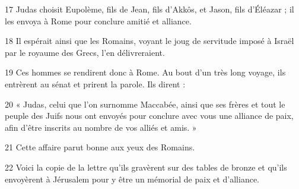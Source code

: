 17 Judas choisit Eupolème, fils de Jean, fils d’Akkôs, et Jason, fils d’Éléazar ; il les envoya à Rome pour conclure amitié et alliance.

18 Il espérait ainsi que les Romains, voyant le joug de servitude imposé à Israël par le royaume des Grecs, l’en délivreraient.

19 Ces hommes se rendirent donc à Rome. Au bout d’un très long voyage, ils entrèrent au sénat et prirent la parole. Ils dirent :

20 « Judas, celui que l’on surnomme Maccabée, ainsi que ses frères et tout le peuple des Juifs nous ont envoyés pour conclure avec vous une alliance de paix, afin d’être inscrits au nombre de vos alliés et amis. »

21 Cette affaire parut bonne aux yeux des Romains.

22 Voici la copie de la lettre qu’ils gravèrent sur des tables de bronze et qu’ils envoyèrent à Jérusalem pour y être un mémorial de paix et d’alliance.
